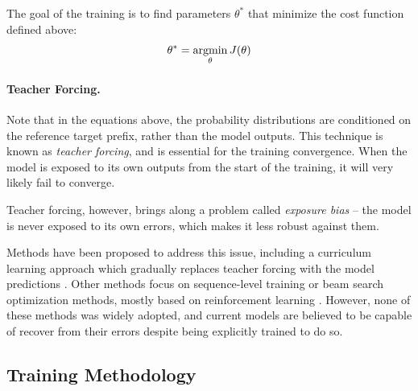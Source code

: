 The goal of the training is to find parameters $\theta^*$ that minimize the
cost function defined above:
\begin{equation}
  \theta^* = \operatorname*{argmin}_{\theta}J(\theta)
\end{equation}


\paragraph{Teacher Forcing.}
Note that in the equations above, the probability distributions are conditioned
on the reference target prefix, rather than the model outputs. This technique
is known as \emph{teacher forcing}, and is essential for the training
convergence. When the model is exposed to its own outputs from the start of the
training, it will very likely fail to converge.

Teacher forcing, however, brings along a problem called \emph{exposure bias} --
the model is never exposed to its own errors, which makes it less robust
against them.

Methods have been proposed to address this issue, including a curriculum
learning approach which gradually replaces teacher forcing with the model
predictions \citep{bengio2015scheduled}. Other methods focus on sequence-level
training or beam search optimization methods, mostly based on reinforcement
learning \citep{williams1992simple, wiseman-rush-2016-sequence,
  daume2009search, ranzato2016sequence}. However, none of these methods was
widely adopted, and current models are believed to be capable of recover from
their errors despite being explicitly trained to do so.


\subsection{Training Methodology}
\label{sec:training:methodology}

